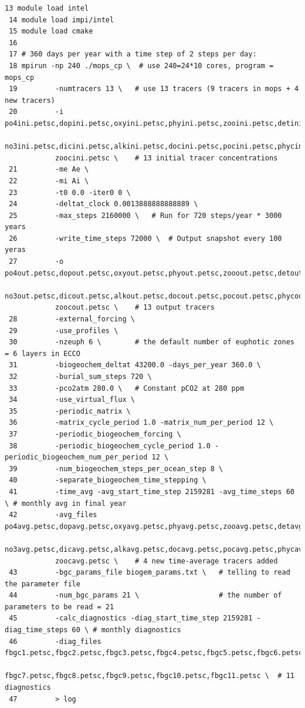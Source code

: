 \documentclass[a4paper]{article}
\begin{document}
\begin{enumerate}
\lstset{language=sh} 
\begin{lstlisting}[frame=single,basicstyle=\scriptsize,commentstyle=\color{blue}]
 13 module load intel
 14 module load impi/intel
 15 module load cmake
 16
 17 # 360 days per year with a time step of 2 steps per day:
 18 mpirun -np 240 ./mops_cp \  # use 240=24*10 cores, program = mops_cp
 19         -numtracers 13 \   # use 13 tracers (9 tracers in mops + 4 new tracers)
 20         -i po4ini.petsc,dopini.petsc,oxyini.petsc,phyini.petsc,zooini.petsc,detini.petsc,
            no3ini.petsc,dicini.petsc,alkini.petsc,docini.petsc,pocini.petsc,phycini.petsc,
            zoocini.petsc \    # 13 initial tracer concentrations
 21         -me Ae \
 22         -mi Ai \
 23         -t0 0.0 -iter0 0 \
 24         -deltat_clock 0.0013888888888889 \
 25         -max_steps 2160000 \   # Run for 720 steps/year * 3000 years
 26         -write_time_steps 72000 \  # Output snapshot every 100 yeras
 27         -o po4out.petsc,dopout.petsc,oxyout.petsc,phyout.petsc,zooout.petsc,detout.petsc,
            no3out.petsc,dicout.petsc,alkout.petsc,docout.petsc,pocout.petsc,phycout.petsc,
            zoocout.petsc \    # 13 output tracers 
 28         -external_forcing \
 29         -use_profiles \
 30         -nzeuph 6 \        # the default number of euphotic zones = 6 layers in ECCO 
 31         -biogeochem_deltat 43200.0 -days_per_year 360.0 \
 32         -burial_sum_steps 720 \
 33         -pco2atm 280.0 \   # Constant pCO2 at 280 ppm
 34         -use_virtual_flux \
 35         -periodic_matrix \
 36         -matrix_cycle_period 1.0 -matrix_num_per_period 12 \
 37         -periodic_biogeochem_forcing \
 38         -periodic_biogeochem_cycle_period 1.0 -periodic_biogeochem_num_per_period 12 \
 39         -num_biogeochem_steps_per_ocean_step 8 \
 40         -separate_biogeochem_time_stepping \
 41         -time_avg -avg_start_time_step 2159281 -avg_time_steps 60 \ # monthly avg in final year
 42         -avg_files po4avg.petsc,dopavg.petsc,oxyavg.petsc,phyavg.petsc,zooavg.petsc,detavg.petsc,
            no3avg.petsc,dicavg.petsc,alkavg.petsc,docavg.petsc,pocavg.petsc,phycavg.petsc,
            zoocavg.petsc \    # 4 new time-average tracers added 
 43         -bgc_params_file biogem_params.txt \   # telling to read the parameter file
 44         -num_bgc_params 21 \                   # the number of parameters to be read = 21
 45         -calc_diagnostics -diag_start_time_step 2159281 -diag_time_steps 60 \ # monthly diagnostics 
 46         -diag_files fbgc1.petsc,fbgc2.petsc,fbgc3.petsc,fbgc4.petsc,fbgc5.petsc,fbgc6.petsc,
            fbgc7.petsc,fbgc8.petsc,fbgc9.petsc,fbgc10.petsc,fbgc11.petsc \  # 11 diagnostics 
 47         > log
\end{lstlisting}
 

\end{enumerate}
\end{document}
